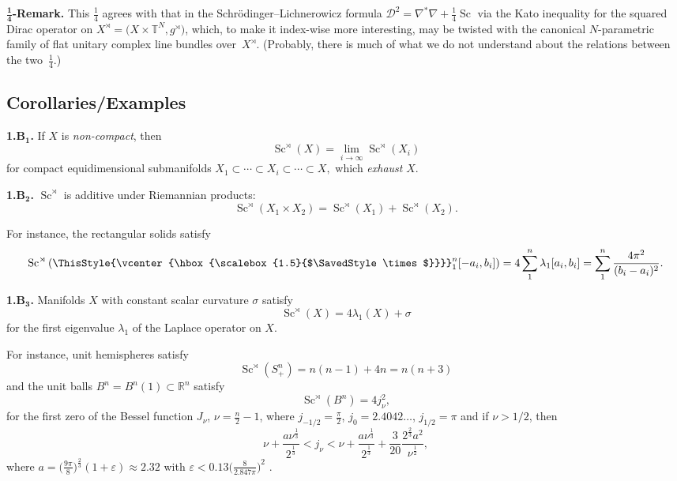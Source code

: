 \documentclass[pdftex]{sigma}
\numberwithin{equation}{section}
\newcommand\bigtimes{\mathbin{\ThisStyle{\vcenter{\hbox{%
\scalebox{1.5}{$\SavedStyle\times$}}}}}}
\begin{document}
\textbf{$\boldsymbol{\frac{1}{4}}$-Remark.} This $\frac{1}{4}$ agrees with that in the
Schr\"odinger--Lichnerowicz formula $\mathcal D^2=\nabla^\ast\nabla+\frac{1}{4}\operatorname{Sc}$ via the Kato inequality for the squared Dirac operator on $X^\rtimes =\bigl(X\times \mathbb T^N, g^\rtimes\bigr)$, which, to make it index-wise more interesting, may be twisted with the canonical $N$-parametric family of flat unitary complex line bundles over~$X^\rtimes$.
(Probably, there is much of what we do not understand about the relations between the two~$\frac{1}{4}$.)

\subsection*{Corollaries/Examples}

\textbf{1.B$\boldsymbol{{}_1}$.} If $X$ is {\it non-compact}, then
\[
\operatorname{Sc}^\rtimes(X) =\lim_{i\to\infty} \operatorname{Sc}^\rtimes(X_i)
\]
for compact equidimensional submanifolds
$X_1\subset \cdots \subset X_i\subset \cdots \subset X,$
which {\it exhaust} $X$.

 \textbf{1.B$\boldsymbol{{}_2}$.} $\operatorname{Sc}^\rtimes $ is additive under Riemannian products:
\[
\operatorname{Sc}^\rtimes (X_1\times X_2)=\operatorname{Sc}^\rtimes (X_1) + \operatorname{Sc}^\rtimes (X_2).
\]

For instance, the rectangular solids satisfy
\[
\operatorname{Sc}^{\rtimes}\left( \bigtimes_1^n[-a_i,b_i]\right)=4\sum_1^n \lambda_1[a_i,b_i]=
\sum_1^n \frac {4\pi^2}{(b_i-a_i)^2}.
\]

 \textbf{1.B$\boldsymbol{{}_3}$.} Manifolds $X$ with constant scalar curvature $\sigma$ satisfy
\[
\operatorname{Sc}^\rtimes(X)=4\lambda_1(X)+\sigma
\]
 for the first eigenvalue $\lambda_1$ of the Laplace operator on $X$.

 For instance,
 unit hemispheres satisfy
\[
\operatorname{Sc}^\rtimes  (S^n_+ )=n(n-1)+4n=n(n+3)
\]
 and the unit balls $B^n=B^n(1)\subset \mathbb R^n$ satisfy
\[
\operatorname{Sc}^\rtimes (B^n)=4j_\nu^2,
\]
 for the first zero of the Bessel function $J_\nu$, $\nu=\frac {n}{2}-1$, where
 $j_{-1/2}=\frac{\pi}{2}$, $j_0=2.4042\dots$, $j_{1/2}=\pi$ and if $\nu>1/2$, then{\samepage
\[
\nu+\frac{a \nu^\frac{1}{3}}{2^\frac{1}{3}}<j_\nu<
\nu+\frac{a \nu^\frac{1}{3}}{2^\frac{1}{3}}+\frac{3}{20}\frac{2^\frac{2}{3}a^2}{\nu^\frac{1}{2}},
\]
 where $a=\bigl(\frac {9\pi}{8} \bigr)^\frac{2}{3}(1+\varepsilon)\approx 2.32$ with
 $\varepsilon< 0.13\bigl(\frac {8}{2.847\pi}\bigr)^{2}$ \cite{QW1999}.}
\end{document}
